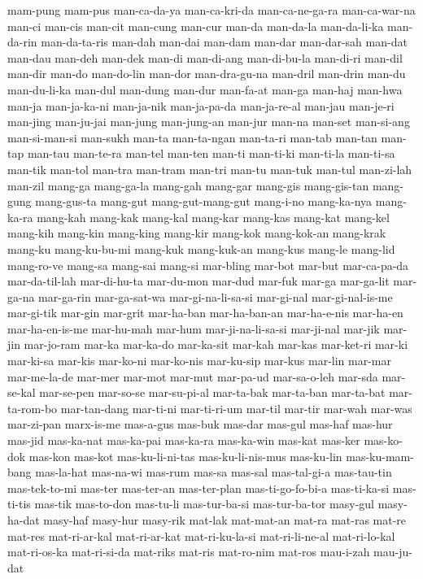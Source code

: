 {mam-pung mam-pus man-ca-da-ya man-ca-kri-da man-ca-ne-ga-ra man-ca-war-na
man-ci man-cis man-cit man-cung man-cur man-da man-da-la man-da-li-ka
man-da-rin man-da-ta-ris man-dah man-dai man-dam man-dar man-dar-sah
man-dat man-dau man-deh man-dek man-di man-di-ang man-di-bu-la man-di-ri
man-dil man-dir man-do man-do-lin man-dor man-dra-gu-na man-dril man-drin
man-du man-du-li-ka man-dul man-dung man-dur man-fa-at man-ga man-haj
man-hwa man-ja man-ja-ka-ni man-ja-nik man-ja-pa-da man-ja-re-al man-jau
man-je-ri man-jing man-ju-jai man-jung man-jung-an man-jur man-na man-set
man-si-ang man-si-man-si man-sukh man-ta man-ta-ngan man-ta-ri man-tab
man-tan man-tap man-tau man-te-ra man-tel man-ten man-ti man-ti-ki
man-ti-la man-ti-sa man-tik man-tol man-tra man-tram man-tri man-tu
man-tuk man-tul man-zi-lah man-zil mang-ga mang-ga-la mang-gah mang-gar
mang-gis mang-gis-tan mang-gung mang-gus-ta mang-gut mang-gut-mang-gut
mang-i-no mang-ka-nya mang-ka-ra mang-kah mang-kak mang-kal mang-kar
mang-kas mang-kat mang-kel mang-kih mang-kin mang-king mang-kir mang-kok
mang-kok-an mang-krak mang-ku mang-ku-bu-mi mang-kuk mang-kuk-an mang-kus
mang-le mang-lid mang-ro-ve mang-sa mang-sai mang-si mar-bling mar-bot
mar-but mar-ca-pa-da mar-da-til-lah mar-di-hu-ta mar-du-mon mar-dud
mar-fuk mar-ga mar-ga-lit mar-ga-na mar-ga-rin mar-ga-sat-wa
mar-gi-na-li-sa-si mar-gi-nal mar-gi-nal-is-me mar-gi-tik mar-gin mar-grit
mar-ha-ban mar-ha-ban-an mar-ha-e-nis mar-ha-en mar-ha-en-is-me mar-hu-mah
mar-hum mar-ji-na-li-sa-si mar-ji-nal mar-jik mar-jin mar-jo-ram mar-ka
mar-ka-do mar-ka-sit mar-kah mar-kas mar-ket-ri mar-ki mar-ki-sa mar-kis
mar-ko-ni mar-ko-nis mar-ku-sip mar-kus mar-lin mar-mar mar-me-la-de
mar-mer mar-mot mar-mut mar-pa-ud mar-sa-o-leh mar-sda mar-se-kal
mar-se-pen mar-so-se mar-su-pi-al mar-ta-bak mar-ta-ban mar-ta-bat
mar-ta-rom-bo mar-tan-dang mar-ti-ni mar-ti-ri-um mar-til mar-tir mar-wah
mar-was mar-zi-pan marx-is-me mas-a-gus mas-buk mas-dar mas-gul mas-haf
mas-hur mas-jid mas-ka-nat mas-ka-pai mas-ka-ra mas-ka-win mas-kat mas-ker
mas-ko-dok mas-kon mas-kot mas-ku-li-ni-tas mas-ku-li-nis-mus mas-ku-lin
mas-ku-mam-bang mas-la-hat mas-na-wi mas-rum mas-sa mas-sal mas-tal-gi-a
mas-tau-tin mas-tek-to-mi mas-ter mas-ter-an mas-ter-plan
mas-ti-go-fo-bi-a mas-ti-ka-si mas-ti-tis mas-tik mas-to-don mas-tu-li
mas-tur-ba-si mas-tur-ba-tor masy-gul masy-ha-dat masy-haf masy-hur
masy-rik mat-lak mat-mat-an mat-ra mat-ras mat-re mat-res mat-ri-ar-kal
mat-ri-ar-kat mat-ri-ku-la-si mat-ri-li-ne-al mat-ri-lo-kal mat-ri-os-ka
mat-ri-si-da mat-riks mat-ris mat-ro-nim mat-ros mau-i-zah mau-ju-dat
}
